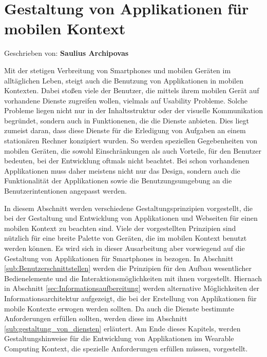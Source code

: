 
\section{Gestaltung von Applikationen für mobilen Kontext}

Geschrieben von: \textbf{Saulius Archipovas}
\newline

Mit der stetigen Verbreitung von Smartphones und mobilen Geräten im alltäglichen Leben, steigt auch die Benutzung von Applikationen in mobilen Kontexten. Dabei stoßen viele der Benutzer, die mittels ihrem mobilen Gerät auf vorhandene Dienste zugreifen wollen, vielmals auf Usability Probleme. Solche Probleme liegen nicht nur in der Inhaltsstruktur oder der visuelle Kommunikation begründet, sondern auch in Funktionenen, die die Dienste anbieten. Dies liegt zumeist daran, dass diese Dienste für die Erledigung von Aufgaben an einem stationären Rechner konzipiert wurden. So werden speziellen Gegebenheiten von mobilen Geräten, die sowohl Einschränkungen als auch Vorteile, für den Benutzer bedeuten, bei der Entwicklung oftmals nicht beachtet.
Bei schon vorhandenen Applikationen muss daher meistens nicht nur das Design, sondern auch die Funktionalität der Applikationen sowie die Benutzungsumgebung an die Benutzerintentionen angepasst werden. 


In diesem Abschnitt werden verschiedene Gestaltungsprinzipien vorgestellt, die bei der Gestaltung und Entwicklung von Applikationen und Webseiten  für einen mobilen Kontext zu beachten sind. Viele der vorgestellten Prinzipien sind nützlich für eine breite Palette von Geräten, die im mobilen Kontext benutzt werden können. Es wird sich in dieser Ausarbeitung aber vorwiegend auf die Gestaltung von Applikationen für Smartphones in bezogen. In Abschnitt \ref{sub:Benutzerschnittstellen} werden die Prinzipien für den Aufbau wesentlicher Bedienelemente und die Interaktionsmöglichkeiten mit ihnen vorgestellt. Hiernach in Abschnitt \ref{sec:Informationsaufbereitung} werden alternative Möglichkeiten der Informationsarchitektur  aufgezeigt, die bei der Erstellung von Applikationen für mobile Kontexte erwogen werden sollten. Da auch die Dienste bestimmte Anforderungen erfüllen sollten, werden diese im Abschnitt \ref{sub:gestaltung_von_diensten} erläutert. Am Ende dieses Kapitels, werden Gestaltungshinweise für die Entwicklung von Applikationen im Wearable Computing Kontext, die spezielle Anforderungen erfüllen müssen, vorgestellt.

